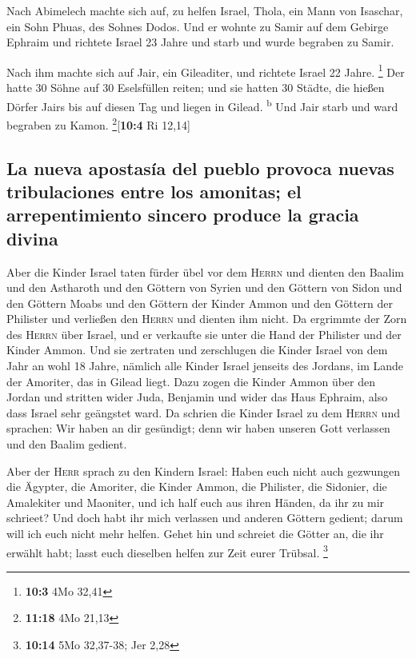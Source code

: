  Nach Abimelech machte sich auf, zu helfen Israel, Thola,
ein Mann von Isaschar, ein Sohn Phuas, des Sohnes Dodos. Und er wohnte
zu Samir auf dem Gebirge Ephraim  und richtete Israel 23
Jahre und starb und wurde begraben zu Samir.

 Nach ihm machte sich auf Jair, ein Gileaditer, und
richtete Israel 22 Jahre. \footnote{\textbf{10:3} 4Mo 32,41}
 Der hatte 30 Söhne auf 30 Eselsfüllen reiten; und sie
hatten 30 Städte, die hießen Dörfer Jairs bis auf diesen Tag und liegen
in Gilead. \textsuperscript{b}  Und Jair starb und ward
begraben zu Kamon. \footnote{\textbf{11:18} 4Mo 21,13}{[}\textbf{10:4}
Ri 12,14{]}

\hypertarget{la-nueva-apostasuxeda-del-pueblo-provoca-nuevas-tribulaciones-entre-los-amonitas-el-arrepentimiento-sincero-produce-la-gracia-divina}{%
\subsection{La nueva apostasía del pueblo provoca nuevas tribulaciones
entre los amonitas; el arrepentimiento sincero produce la gracia
divina}\label{la-nueva-apostasuxeda-del-pueblo-provoca-nuevas-tribulaciones-entre-los-amonitas-el-arrepentimiento-sincero-produce-la-gracia-divina}}

 Aber die Kinder Israel taten fürder übel vor dem
\textsc{Herrn} und dienten den Baalim und den Astharoth und den Göttern
von Syrien und den Göttern von Sidon und den Göttern Moabs und den
Göttern der Kinder Ammon und den Göttern der Philister und verließen den
\textsc{Herrn} und dienten ihm nicht.  Da ergrimmte der
Zorn des \textsc{Herrn} über Israel, und er verkaufte sie unter die Hand
der Philister und der Kinder Ammon.  Und sie zertraten und
zerschlugen die Kinder Israel von dem Jahr an wohl 18 Jahre, nämlich
alle Kinder Israel jenseits des Jordans, im Lande der Amoriter, das in
Gilead liegt.  Dazu zogen die Kinder Ammon über den Jordan
und stritten wider Juda, Benjamin und wider das Haus Ephraim, also dass
Israel sehr geängstet ward.  Da schrien die Kinder Israel
zu dem \textsc{Herrn} und sprachen: Wir haben an dir gesündigt; denn wir
haben unseren Gott verlassen und den Baalim gedient.

 Aber der \textsc{Herr} sprach zu den Kindern Israel:
Haben euch nicht auch gezwungen die Ägypter, die Amoriter, die Kinder
Ammon, die Philister,  die Sidonier, die Amalekiter und
Maoniter, und ich half euch aus ihren Händen, da ihr zu mir schrieet?
 Und doch habt ihr mich verlassen und anderen Göttern
gedient; darum will ich euch nicht mehr helfen.  Gehet
hin und schreiet die Götter an, die ihr erwählt habt; lasst euch
dieselben helfen zur Zeit eurer Trübsal. \footnote{\textbf{10:14} 5Mo
  32,37-38; Jer 2,28}

